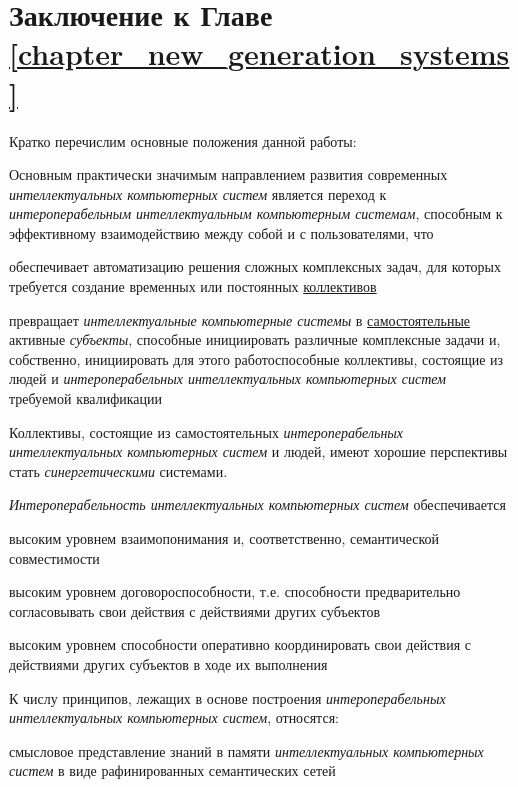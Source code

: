 \section*{Заключение к Главе \ref{chapter_new_generation_systems}}
Кратко перечислим основные положения данной работы:

\begin{textitemize}
	\item Основным практически значимым направлением развития современных \textit{интеллектуальных компьютерных систем} является переход к \textit{интероперабельным} \textit{интеллектуальным компьютерным системам}, способным к эффективному взаимодействию между собой и с пользователями, что
	\begin{textitemize}
		\item обеспечивает автоматизацию решения сложных комплексных задач, для которых требуется создание временных или постоянных \underline{коллективов}
		\item превращает \textit{интеллектуальные компьютерные системы} в \underline{самостоятельные} активные \textit{субъекты}, способные инициировать различные комплексные задачи и, собственно, инициировать для этого работоспособные коллективы, состоящие из людей и \textit{интероперабельных интеллектуальных компьютерных систем} требуемой квалификации 
	\end{textitemize}
	\item Коллективы, состоящие из самостоятельных \textit{интероперабельных интеллектуальных компьютерных систем} и людей, имеют хорошие перспективы стать \textit{синергетическими} системами.
	\item \textit{Интероперабельность интеллектуальных компьютерных систем} обеспечивается
	\begin{textitemize}
		\item высоким уровнем взаимопонимания и, соответственно, семантической совместимости
		\item высоким уровнем договороспособности, т.е. способности предварительно согласовывать свои действия с действиями других субъектов
		\item высоким уровнем способности оперативно координировать свои действия с действиями других субъектов в ходе их выполнения
	\end{textitemize}
	\item К числу принципов, лежащих в основе построения \textit{интероперабельных интеллектуальных компьютерных систем}, относятся:
	\begin{textitemize}
		\item смысловое представление знаний в памяти \textit{интеллектуальных компьютерных систем} в виде рафинированных семантических сетей

\end{textitemize}
\end{textitemize}
